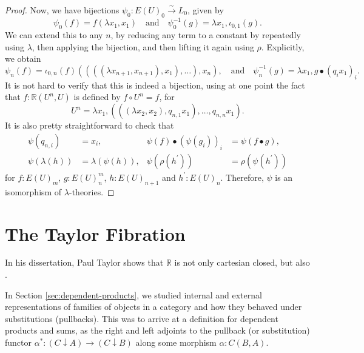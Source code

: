 \begin{proof}
  Now, we have bijections $ \psi_0: E(U)_0 \xrightarrow{\sim} L_0 $, given by
  \[ \psi_0(f) = f (\lambda x_1, x_1) \quad \text{and} \quad \psi_0^{-1}(g) = \lambda x_1, \iota_{0, 1}(g). \]
  We can extend this to any $ n $, by reducing any term to a constant by repeatedly using $ \lambda $, then applying the bijection, and then lifting it again using $ \rho $. Explicitly, we obtain
  \[ \psi_n(f) = \iota_{0, n}(f) ((((\lambda x_{n+1}, x_{n+1}), x_1), \dots), x_n), \quad \text{and} \quad \psi^{-1}_n(g) = \lambda x_1, g \bullet (q_i x_1)_i. \]
  It is not hard to verify that this is indeed a bijection, using at one point the fact that $ f: \mathbb R(U^n, U) $ is defined by $ f \circ U^n = f $, for
  \[ U^n = \lambda x_1, (((\lambda x_2, x_2), q_{n, 1} x_1 ), \dots, q_{n, n} x_1 ). \]
  It is also pretty straightforward to check that
  \begin{align*}
    \psi(q_{n, i}) &= x_i, & \psi(f) \bullet (\psi(g_i))_i &= \psi(f \bullet g),\\
    \psi(\lambda(h)) &= \lambda(\psi(h)), & \psi(\rho(h^\prime)) &= \rho(\psi(h^\prime))
  \end{align*}
  for $ f: E(U)_m $, $ g: E(U)_n^m $, $ h: E(U)_{n + 1} $ and $ h^\prime : E(U)_n $. Therefore, $ \psi $ is an isomorphism of $ \lambda $-theories.
\end{proof}

\section{The Taylor Fibration}

In his dissertation, Paul Taylor shows that $ \mathbb R $ is not only cartesian closed, but also .

In Section \ref{sec:dependent-products}, we studied internal and external representations of families of objects in a category and how they behaved under substitutions (pullbacks). This was to arrive at a definition for dependent products and sums, as the right and left adjoints to the pullback (or substitution) functor $ \alpha^*: (C \downarrow A) \to (C \downarrow B) $ along some morphism $ \alpha : C(B, A) $.

